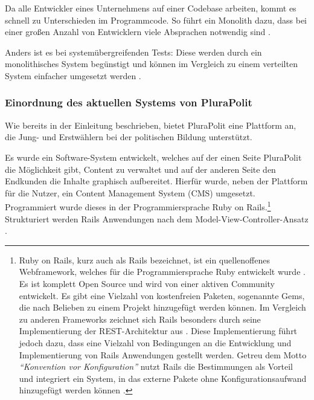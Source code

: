 Da alle Entwickler eines Unternehmens auf einer Codebase arbeiten, kommt es schnell zu Unterschieden im Programmcode. So führt ein Monolith dazu, dass bei einer großen Anzahl von Entwicklern viele Absprachen notwendig sind \parencite[vgl.][Kap. 2.2.4]{newman_monolith_2019}.

Anders ist es bei systemübergreifenden Tests: Diese werden durch ein monolithisches System begünstigt und können im Vergleich zu einem verteilten System einfacher umgesetzt werden  \parencite[vgl.][Kap. 2.2.5]{newman_monolith_2019}.

\subsubsection{Einordnung des aktuellen Systems von PluraPolit}
\label{sec:einordnung}

Wie bereits in der Einleitung beschrieben, bietet PluraPolit eine Plattform an, die Jung- und Erstwählern bei der politischen Bildung unterstützt.

Es wurde ein Software-System entwickelt, welches auf der einen Seite PluraPolit die Möglichkeit gibt, Content zu verwaltet und auf der anderen Seite den Endkunden die Inhalte graphisch aufbereitet. Hierfür wurde, neben der Plattform für die Nutzer, ein Content Management System (CMS) umgesetzt. Programmiert wurde dieses in der Programmiersprache Ruby on Rails.\footnote{
Ruby on Rails, kurz auch als Rails bezeichnet, ist ein quellenoffenes Webframework, welches für die Programmiersprache Ruby entwickelt wurde \parencites[vgl.][S.4]{hartl_ruby_2016}{ruby_org}[vgl.][S. 24]{sieben_wochen}. Es ist komplett Open Source und wird von einer aktiven Community entwickelt. Es gibt eine Vielzahl von kostenfreien Paketen, sogenannte Gems, die nach Belieben zu einem Projekt hinzugefügt werden können. Im Vergleich zu anderen Frameworks zeichnet sich Rails besonders durch seine Implementierung der REST-Architektur aus \parencite[vgl.][S. 5]{hartl_ruby_2016}. Diese Implementierung führt jedoch dazu, dass eine Vielzahl von Bedingungen an die Entwicklung und Implementierung von Rails Anwendungen gestellt werden. Getreu dem Motto \textit{\enquote{Konvention vor Konfiguration}} nutzt Rails die Bestimmungen als Vorteil und integriert ein System, in das externe Pakete ohne Konfigurationsaufwand hinzugefügt werden können \parencite{ruby_doctrine}.
} Strukturiert werden Rails Anwendungen nach dem Model-View-Controller-Ansatz \parencites[vgl.][S. 66 ff.]{hartl_ruby_2016}.

